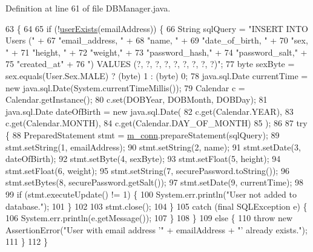 Definition at line 61 of file D\+B\+Manager.\+java.


\begin{DoxyCode}
63                                                                                                         \{
64 
65         \textcolor{keywordflow}{if} (!\mbox{\hyperlink{classcom_1_1activitytracker_1_1_d_b_manager_af05d79f33ecf2920a67d1b9cf82c079f}{userExists}}(emailAddress)) \{
66             String sqlQuery = \textcolor{stringliteral}{"INSERT INTO Users ("} +
67                     \textcolor{stringliteral}{"email\_address, "} +
68                     \textcolor{stringliteral}{"name, "} +
69                     \textcolor{stringliteral}{"date\_of\_birth, "} +
70                     \textcolor{stringliteral}{"sex, "} +
71                     \textcolor{stringliteral}{"height, "} +
72                     \textcolor{stringliteral}{"weight,"} +
73                     \textcolor{stringliteral}{"password\_hash,"} +
74                     \textcolor{stringliteral}{"password\_salt,"} +
75                     \textcolor{stringliteral}{"created\_at"} +
76                     \textcolor{stringliteral}{") VALUES (?, ?, ?, ?, ?, ?, ?, ?, ?)"};
77             byte sexByte = sex.equals(User.Sex.MALE) ? (byte) 1 : (byte) 0;
78             java.sql.Date currentTime = \textcolor{keyword}{new} java.sql.Date(System.currentTimeMillis());
79             Calendar c = Calendar.getInstance();
80             c.set(DOBYear, DOBMonth, DOBDay);
81             java.sql.Date dateOfBirth = \textcolor{keyword}{new} java.sql.Date(
82                     c.get(Calendar.YEAR),
83                     c.get(Calendar.MONTH),
84                     c.get(Calendar.DAY\_OF\_MONTH)
85             );
86 
87             \textcolor{keywordflow}{try} \{
88                 PreparedStatement stmt = \mbox{\hyperlink{classcom_1_1activitytracker_1_1_d_b_manager_a064088d13ac09eb147fdc19268771521}{m\_conn}}.prepareStatement(sqlQuery);
89                 stmt.setString(1, emailAddress);
90                 stmt.setString(2, name);
91                 stmt.setDate(3, dateOfBirth);
92                 stmt.setByte(4, sexByte);
93                 stmt.setFloat(5, height);
94                 stmt.setFloat(6, weight);
95                 stmt.setString(7, securePassword.toString());
96                 stmt.setBytes(8, securePassword.getSalt());
97                 stmt.setDate(9, currentTime);
98 
99                 \textcolor{keywordflow}{if} (stmt.executeUpdate() != 1) \{
100                     System.err.println(\textcolor{stringliteral}{"User not added to database."});
101                 \}
102 
103                 stmt.close();
104             \}
105             \textcolor{keywordflow}{catch} (\textcolor{keyword}{final} SQLException e) \{
106                 System.err.println(e.getMessage());
107             \}
108         \}
109         \textcolor{keywordflow}{else} \{
110             \textcolor{keywordflow}{throw} \textcolor{keyword}{new} AssertionError(\textcolor{stringliteral}{"User with email address '"} + emailAddress + \textcolor{stringliteral}{"' already exists."});
111         \}
112     \}
\end{DoxyCode}
